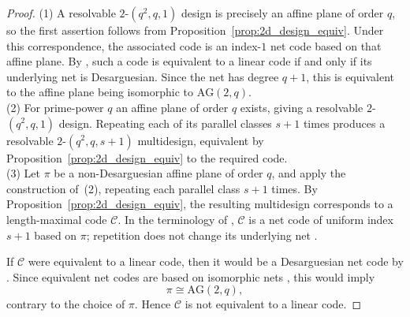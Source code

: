 \documentclass[12pt, letterpaper]{article}
\theoremstyle{plain}
\theoremstyle{definition}
\newcommand{\mc}[1]{\mathcal{#1}}
\begin{document}
	\begin{proof}
(1) A resolvable $2$-$(q^2,q,1)$ design is precisely an affine plane of order $q$, so the first assertion follows from Proposition~\ref{prop:2d_design_equiv}. Under this correspondence, the associated code is an index-$1$ net code based on that affine plane. By \cite[Theorem~2.5]{AldersonNetCodes2008}, such a code is equivalent to a linear code if and only if its underlying net is Desarguesian. Since the net has degree $q+1$, this is equivalent to the affine plane being isomorphic to $\mathrm{AG}(2,q)$.\\
		(2) For prime-power $q$ an affine plane of order $q$ exists, giving a resolvable $2$-$(q^2, q, 1)$ design. Repeating each of its parallel classes $s+1$ times produces a resolvable $2$-$(q^2, q, s+1)$ multidesign, equivalent by Proposition~\ref{prop:2d_design_equiv} to the required code. \\
		(3) Let $\pi$ be a non-Desarguesian affine plane of order $q$, and apply the construction of~(2), repeating each parallel class $s+1$ times. By Proposition~\ref{prop:2d_design_equiv}, the resulting multidesign corresponds to a length-maximal code $\mc C$. In the terminology of \cite{AldersonNetCodes2008}, $\mc C$ is a net code of uniform index $s+1$ based on $\pi$; repetition does not change its underlying net \cite[Lemma~2.1]{AldersonNetCodes2008}.
		
		If $\mc C$ were equivalent to a linear code, then it would be a Desarguesian net code by \cite[Theorem~2.5]{AldersonNetCodes2008}. Since equivalent net codes are based on isomorphic nets \cite[Theorem~2.4]{AldersonNetCodes2008}, this would imply
		\[
		\pi\cong\mathrm{AG}(2,q),
		\]
		contrary to the choice of $\pi$. Hence $\mc C$ is not equivalent to a linear code.
		

\end{proof}
\end{document}
